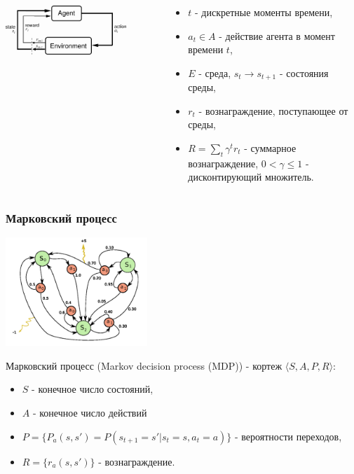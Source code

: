 \documentclass[12pt]{beamer}
\begin{document}
\begin{frame}
\begin{columns}
\begin{column}{0.6\textwidth}
				\includegraphics[width=0.8\textwidth]{rl_intro.png}
			\end{column}
			\begin{column}{0.5\textwidth}
				\begin{itemize}
					\item $t$ - дискретные моменты времени,
					\item $a_t\in A$ - действие агента в момент времени $t$,
					\item $E$ - среда, $s_t\rightarrow s_{t+1}$ - состояния среды,
					\item $r_t$ - вознаграждение, поступающее от среды,
					\item $R=\sum\limits_{t}{{{\gamma }^{t}}}{{r}_{t}}$ - суммарное вознаграждение, $0<\gamma \le 1$  - дисконтирующий множитель.
				\end{itemize}
			\end{column}

		\end{columns}
		
	\end{frame}	

	\begin{frame}
		\frametitle{Марковский процесс}
		
		\begin{center}
			\includegraphics[width=0.4\textwidth]{mdp.png}
		\end{center}
		\par\bigskip
		
		Марковский процесс (Markov decision process (MDP)) - кортеж $\langle S, A, P, R\rangle$:
		\begin{itemize}
			\item $S$ - конечное число состояний,
			\item $A$ - конечное число действий
			\item $P=\{P_a(s,s')=P(s_{t+1}=s'|s_t=s, a_t=a)\}$ - вероятности переходов,
			\item $R=\{r_a(s,s')\}$ - вознаграждение.
		\end{itemize}
		
		
	\end{frame}
\end{document}
